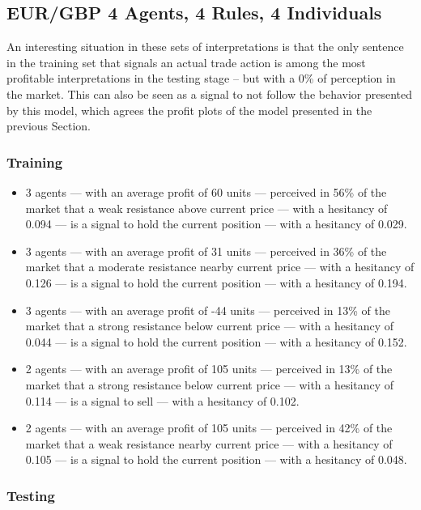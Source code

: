 \subsection{EUR/GBP 4 Agents, 4 Rules, 4 Individuals}
\label{}

An interesting situation in these sets of interpretations is that the only
sentence in the training set that signals an actual trade action is among the
most profitable interpretations in the testing stage -- but with a 0\% of
perception in the market. This can also be seen as a signal to not follow the
behavior presented by this model, which agrees the profit plots of the model
presented in the previous Section.

\subsubsection{Training}
\label{}

{\small
  \begin{itemize}
  \item 3 agents — with an average profit of 60 units — perceived in 56\% of the
    market that a weak resistance above current price — with a hesitancy of
    0.094 — is a signal to hold the current position — with a hesitancy of
    0.029.
  \item 3 agents — with an average profit of 31 units — perceived in 36\% of the
    market that a moderate resistance nearby current price — with a hesitancy of
    0.126 — is a signal to hold the current position — with a hesitancy of
    0.194.
  \item 3 agents — with an average profit of -44 units — perceived in 13\% of
    the market that a strong resistance below current price — with a hesitancy
    of 0.044 — is a signal to hold the current position — with a hesitancy of
    0.152.
  \item 2 agents — with an average profit of 105 units — perceived in 13\% of
    the market that a strong resistance below current price — with a hesitancy
    of 0.114 — is a signal to sell — with a hesitancy of 0.102.
  \item 2 agents — with an average profit of 105 units — perceived in 42\% of
    the market that a weak resistance nearby current price — with a hesitancy of
    0.105 — is a signal to hold the current position — with a hesitancy of
    0.048.
  \end{itemize}
}

\subsubsection{Testing}
\label{}

